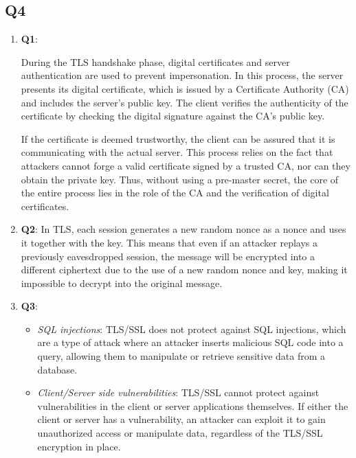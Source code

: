 \documentclass{article}
\begin{document}
\subsection{Q4}

	\begin{enumerate}
		\item \textbf{Q1}: 

		During the TLS handshake phase, digital certificates and server authentication are used to prevent impersonation. In this process, the server presents its digital certificate, which is issued by a Certificate Authority (CA) and includes the server's public key. The client verifies the authenticity of the certificate by checking the digital signature against the CA's public key.

		If the certificate is deemed trustworthy, the client can be assured that it is communicating with the actual server. This process relies on the fact that attackers cannot forge a valid certificate signed by a trusted CA, nor can they obtain the private key. Thus, without using a pre-master secret, the core of the entire process lies in the role of the CA and the verification of digital certificates\cite{5-2.security-protocol}.

		\item \textbf{Q2}:
		In TLS, each session generates a new random nonce as a nonce and uses it together with the key\cite{5-2.security-protocol}. This means that even if an attacker replays a previously eavesdropped session, the message will be encrypted into a different ciphertext due to the use of a new random nonce and key, making it impossible to decrypt into the original message. 

		\item \textbf{Q3}:
			\begin{itemize}
				\item \textit{SQL injections}: TLS/SSL does not protect against SQL injections, which are a type of attack where an attacker inserts malicious SQL code into a query, allowing them to manipulate or retrieve sensitive data from a database\cite{5-2.security-protocol}.

				\item \textit{Client/Server side vulnerabilities}: TLS/SSL cannot protect against vulnerabilities in the client or server applications themselves\cite{5-2.security-protocol}. If either the client or server has a vulnerability, an attacker can exploit it to gain unauthorized access or manipulate data, regardless of the TLS/SSL encryption in place.
			\end{itemize}

	\end{enumerate}
\end{document}
